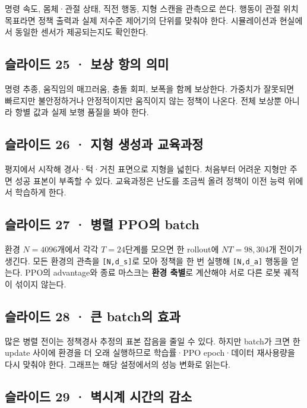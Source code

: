 \documentclass[11pt,a4paper]{article}
\begin{document}
명령 속도, 몸체·관절 상태, 직전 행동, 지형 스캔을 관측으로 쓴다. 행동이 관절 위치 목표라면 정책 출력과 실제 저수준 제어기의 단위를 맞춰야 한다. 시뮬레이션과 현실에서 동일한 센서가 제공되는지도 확인한다.\par

\subsection{슬라이드 25 · 보상 항의 의미}

명령 추종, 움직임의 매끄러움, 충돌 회피, 보폭을 함께 보상한다. 가중치가 잘못되면 빠르지만 불안정하거나 안정적이지만 움직이지 않는 정책이 나온다. 전체 보상뿐 아니라 항별 값과 실제 보행 품질을 봐야 한다.\par

\subsection{슬라이드 26 · 지형 생성과 교육과정}

평지에서 시작해 경사·턱·거친 표면으로 지형을 넓힌다. 처음부터 어려운 지형만 주면 성공 표본이 부족할 수 있다. 교육과정은 난도를 조금씩 올려 정책이 이전 능력 위에서 학습하게 한다.\par

\subsection{슬라이드 27 · 병렬 PPO의 batch}

환경 $N=4096$개에서 각각 $T=24$단계를 모으면 한 rollout에 $NT=98{,}304$개 전이가 생긴다. 모든 환경의 관측을 \texttt{[N,\allowbreak{}d\_\allowbreak{}s]}로 모아 정책을 한 번 실행해 \texttt{[N,\allowbreak{}d\_\allowbreak{}a]} 행동을 얻는다. PPO의 advantage와 종료 마스크는 \textbf{환경 축별}로 계산해야 서로 다른 로봇 궤적이 섞이지 않는다.\par

\subsection{슬라이드 28 · 큰 batch의 효과}

많은 병렬 전이는 정책경사 추정의 표본 잡음을 줄일 수 있다. 하지만 batch가 크면 한 update 사이에 환경을 더 오래 실행하므로 학습률·PPO epoch·데이터 재사용량을 다시 맞춰야 한다. 그래프는 해당 설정에서의 성능 변화로 읽는다.\par

\subsection{슬라이드 29 · 벽시계 시간의 감소}
\end{document}
